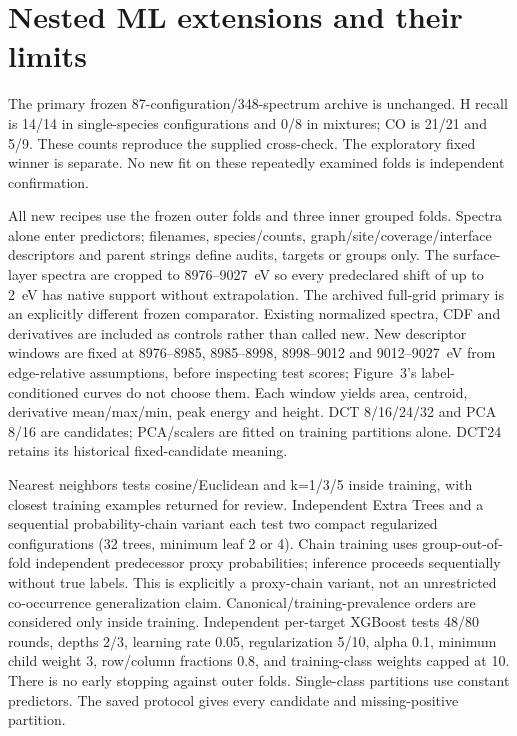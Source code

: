 \section{Nested ML extensions and their limits}
The primary frozen 87-configuration/348-spectrum archive is unchanged. H recall is 14/14 in single-species configurations and 0/8 in mixtures; CO is 21/21 and 5/9. These counts reproduce the supplied cross-check. The exploratory fixed winner is separate. No new fit on these repeatedly examined folds is independent confirmation.

All new recipes use the frozen outer folds and three inner grouped folds. Spectra alone enter predictors; filenames, species/counts, graph/site/coverage/interface descriptors and parent strings define audits, targets or groups only. The surface-layer spectra are cropped to 8976--9027~eV so every predeclared shift of up to 2~eV has native support without extrapolation. The archived full-grid primary is an explicitly different frozen comparator. Existing normalized spectra, CDF and derivatives are included as controls rather than called new. New descriptor windows are fixed at 8976--8985, 8985--8998, 8998--9012 and 9012--9027~eV from edge-relative assumptions, before inspecting test scores; Figure~3's label-conditioned curves do not choose them. Each window yields area, centroid, derivative mean/max/min, peak energy and height. DCT 8/16/24/32 and PCA 8/16 are candidates; PCA/scalers are fitted on training partitions alone. DCT24 retains its historical fixed-candidate meaning.

Nearest neighbors tests cosine/Euclidean and k=1/3/5 inside training, with closest training examples returned for review. Independent Extra Trees and a sequential probability-chain variant each test two compact regularized configurations (32 trees, minimum leaf 2 or 4). Chain training uses group-out-of-fold independent predecessor proxy probabilities; inference proceeds sequentially without true labels. This is explicitly a proxy-chain variant, not an unrestricted co-occurrence generalization claim. Canonical/training-prevalence orders are considered only inside training. Independent per-target XGBoost tests 48/80 rounds, depths 2/3, learning rate 0.05, regularization 5/10, alpha 0.1, minimum child weight 3, row/column fractions 0.8, and training-class weights capped at 10. There is no early stopping against outer folds. Single-class partitions use constant predictors. The saved protocol gives every candidate and missing-positive partition.

